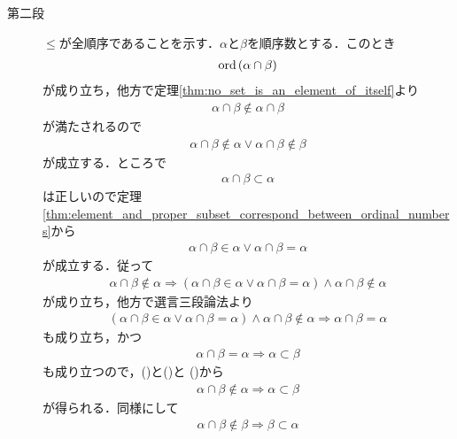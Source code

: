 \begin{prf}
\begin{description}
			\item[第二段]
				$\leq$が全順序であることを示す．$\alpha$と$\beta$を順序数とする．このとき
				\begin{align}
					\operatorname*{ord}\hspace{0.15em}(\alpha \cap \beta)
				\end{align}
				が成り立ち，他方で定理\ref{thm:no_set_is_an_element_of_itself}より
				\begin{align}
					\alpha \cap \beta \notin \alpha \cap \beta
				\end{align}
				が満たされるので
				\begin{align}
					\alpha \cap \beta \notin \alpha \vee \alpha \cap \beta \notin \beta
					\label{eq:thm_On_is_wellordered_5}
				\end{align}
				が成立する．ところで
				\begin{align}
					\alpha \cap \beta \subset \alpha
				\end{align}
				は正しいので定理\ref{thm:element_and_proper_subset_correspond_between_ordinal_numbers}から
				\begin{align}
					\alpha \cap \beta \in \alpha \vee \alpha \cap \beta = \alpha
				\end{align}
				が成立する．従って
				\begin{align}
					\alpha \cap \beta \notin \alpha \Longrightarrow 
					(\alpha \cap \beta \in \alpha \vee \alpha \cap \beta = \alpha) \wedge \alpha \cap \beta \notin \alpha
					\label{eq:thm_On_is_wellordered_2}
				\end{align}
				が成り立ち，他方で選言三段論法より
				\begin{align}
					(\alpha \cap \beta \in \alpha \vee \alpha \cap \beta = \alpha) \wedge \alpha \cap \beta \notin \alpha
					\Longrightarrow \alpha \cap \beta = \alpha
					\label{eq:thm_On_is_wellordered_3}
				\end{align}
				も成り立ち，かつ
				\begin{align}
					\alpha \cap \beta = \alpha \Longrightarrow \alpha \subset \beta
					\label{eq:thm_On_is_wellordered_4}
				\end{align}
				も成り立つので，()と()と
				()から
				\begin{align}
					\alpha \cap \beta \notin \alpha \Longrightarrow \alpha \subset \beta
				\end{align}
				が得られる．同様にして
				\begin{align}
					\alpha \cap \beta \notin \beta \Longrightarrow \beta \subset \alpha

\end{align}
\end{description}
\end{prf}
